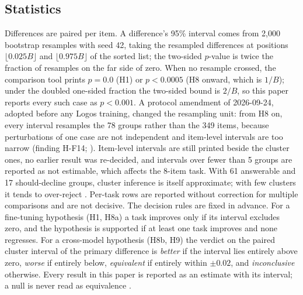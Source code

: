\subsection{Statistics}
Differences are paired per item. A difference's 95\% interval comes from 2,000 bootstrap resamples with seed 42, taking the resampled differences at positions $\lfloor 0.025 B \rfloor$ and $\lfloor 0.975 B \rfloor$ of the sorted list; the two-sided $p$-value is twice the fraction of resamples on the far side of zero. When no resample crossed, the comparison tool prints $p = 0.0$ (H1) or $p < 0.0005$ (H8 onward, which is $1/B$); under the doubled one-sided fraction the two-sided bound is $2/B$, so this paper reports every such case as $p < 0.001$. A protocol amendment of 2026-09-24, adopted before any Logos training, changed the resampling unit: from H8 on, every interval resamples the 78 groups rather than the 349 items, because perturbations of one case are not independent and item-level intervals are too narrow (finding H-F14; \citealp{field2007clustered,miller2024errorbars}). Item-level intervals are still printed beside the cluster ones, no earlier result was re-decided, and intervals over fewer than 5 groups are reported as not estimable, which affects the 8-item  task. With 61 answerable and 17 should-decline groups, cluster inference is itself approximate; with few clusters it tends to over-reject \citep{cameron2008bootstrap}. Per-task rows are reported without correction for multiple comparisons and are not decisive. The decision rules are fixed in advance. For a fine-tuning hypothesis (H1, H8a) a task improves only if its interval excludes zero, and the hypothesis is supported if at least one task improves and none regresses. For a cross-model hypothesis (H8b, H9) the verdict on the paired cluster interval of the primary difference is \emph{better} if the interval lies entirely above zero, \emph{worse} if entirely below, \emph{equivalent} if entirely within $\pm 0.02$, and \emph{inconclusive} otherwise. Every result in this paper is reported as an estimate with its interval; a null is never read as equivalence \citep{altman1995absence}.

